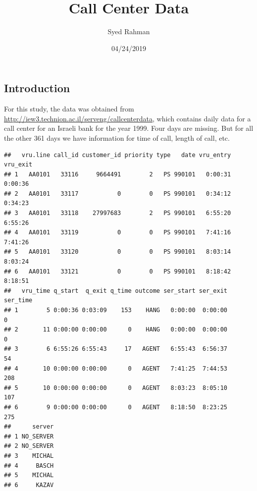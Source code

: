 \documentclass[]{article}
\title{Call Center Data}
\author{Syed Rahman}
\date{04/24/2019}
\newenvironment{Shaded}{\begin{snugshade}}{\end{snugshade}}
\newcommand{\KeywordTok}[1]{\textcolor[rgb]{0.13,0.29,0.53}{\textbf{#1}}}
\newcommand{\DataTypeTok}[1]{\textcolor[rgb]{0.13,0.29,0.53}{#1}}
\newcommand{\DecValTok}[1]{\textcolor[rgb]{0.00,0.00,0.81}{#1}}
\newcommand{\StringTok}[1]{\textcolor[rgb]{0.31,0.60,0.02}{#1}}
\newcommand{\OtherTok}[1]{\textcolor[rgb]{0.56,0.35,0.01}{#1}}
\newcommand{\ControlFlowTok}[1]{\textcolor[rgb]{0.13,0.29,0.53}{\textbf{#1}}}
\newcommand{\OperatorTok}[1]{\textcolor[rgb]{0.81,0.36,0.00}{\textbf{#1}}}
\newcommand{\NormalTok}[1]{#1}
\begin{document}
\maketitle

\subsection{Introduction}\label{introduction}

For this study, the data was obtained from
\url{http://iew3.technion.ac.il/serveng/callcenterdata}, which contains
daily data for a call center for an Israeli bank for the year 1999. Four
days are missing. But for all the other 361 days we have information for
time of call, length of call, etc.

\begin{Shaded}
\end{Shaded}

\begin{verbatim}
##   vru.line call_id customer_id priority type   date vru_entry vru_exit
## 1   AA0101   33116     9664491        2   PS 990101   0:00:31  0:00:36
## 2   AA0101   33117           0        0   PS 990101   0:34:12  0:34:23
## 3   AA0101   33118    27997683        2   PS 990101   6:55:20  6:55:26
## 4   AA0101   33119           0        0   PS 990101   7:41:16  7:41:26
## 5   AA0101   33120           0        0   PS 990101   8:03:14  8:03:24
## 6   AA0101   33121           0        0   PS 990101   8:18:42  8:18:51
##   vru_time q_start  q_exit q_time outcome ser_start ser_exit ser_time
## 1        5 0:00:36 0:03:09    153    HANG   0:00:00  0:00:00        0
## 2       11 0:00:00 0:00:00      0    HANG   0:00:00  0:00:00        0
## 3        6 6:55:26 6:55:43     17   AGENT   6:55:43  6:56:37       54
## 4       10 0:00:00 0:00:00      0   AGENT   7:41:25  7:44:53      208
## 5       10 0:00:00 0:00:00      0   AGENT   8:03:23  8:05:10      107
## 6        9 0:00:00 0:00:00      0   AGENT   8:18:50  8:23:25      275
##      server
## 1 NO_SERVER
## 2 NO_SERVER
## 3    MICHAL
## 4     BASCH
## 5    MICHAL
## 6     KAZAV
\end{verbatim}
\end{document}
